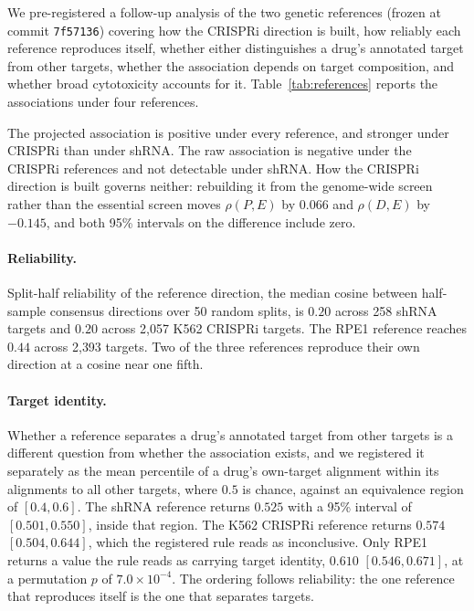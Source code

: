 \documentclass[11pt]{article}
\begin{document}
We pre-registered a follow-up analysis of the two genetic references (frozen at
commit \texttt{7f57136}) covering how the CRISPRi direction is built, how reliably
each reference reproduces itself, whether either distinguishes a drug's annotated
target from other targets, whether the association depends on target composition,
and whether broad cytotoxicity accounts for it. Table~\ref{tab:references} reports
the associations under four references.

The projected association is positive under every reference, and stronger under
CRISPRi than under shRNA. The raw association is negative under the CRISPRi
references and not detectable under shRNA. How the CRISPRi direction is built
governs neither: rebuilding it from the genome-wide screen rather than the essential
screen moves $\rho(P, E)$ by $0.066$ and $\rho(D, E)$ by $-0.145$, and both 95\%
intervals on the difference include zero.

\paragraph{Reliability.} Split-half reliability of the reference direction, the
median cosine between half-sample consensus directions over 50 random splits, is
$0.20$ across 258 shRNA targets and $0.20$ across 2{,}057 K562 CRISPRi targets. The
RPE1 reference reaches $0.44$ across 2{,}393 targets. Two of the three references
reproduce their own direction at a cosine near one fifth.

\paragraph{Target identity.} Whether a reference separates a drug's annotated target
from other targets is a different question from whether the association exists, and
we registered it separately as the mean percentile of a drug's own-target alignment
within its alignments to all other targets, where $0.5$ is chance, against an
equivalence region of $[0.4, 0.6]$. The shRNA reference returns $0.525$ with a 95\%
interval of $[0.501, 0.550]$, inside that region. The K562 CRISPRi reference returns
$0.574$ $[0.504, 0.644]$, which the registered rule reads as inconclusive. Only RPE1
returns a value the rule reads as carrying target identity, $0.610$ $[0.546,
0.671]$, at a permutation $p$ of $7.0 \times 10^{-4}$. The ordering follows
reliability: the one reference that reproduces itself is the one that separates
targets.
\end{document}
